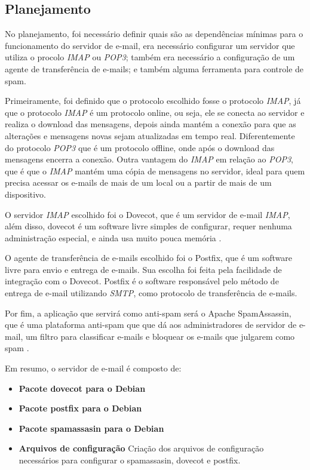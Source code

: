 \subsection{Planejamento}

No planejamento, foi necessário definir
quais são as dependências mínimas para o funcionamento do servidor de e-mail, era 
necessário configurar um servidor que utiliza o procolo \textit{IMAP} ou \textit{POP3};
também era necessário a configuração de um agente de transferência de e-mails; e também
alguma ferramenta para controle de spam.

Primeiramente, foi definido que o protocolo escolhido fosse o protocolo \textit{IMAP}, já
que o protocolo \textit{IMAP} é um protocolo online, ou seja, ele se conecta ao servidor
e realiza o download das mensagens, depois ainda  mantém a conexão para que
as alterações e mensagens novas sejam atualizadas em tempo real. Diferentemente do
protocolo \textit{POP3} que é um protocolo offline, onde após o download das mensagens encerra
a conexão. Outra vantagem do \textit{IMAP} em relação ao \textit{POP3}, que é que o 
\textit{IMAP} mantém uma cópia de mensagens no servidor, ideal para quem precisa 
acessar os e-mails de mais de um local ou a partir de mais de um dispositivo.

O servidor \textit{IMAP} escolhido foi o Dovecot, que é um servidor de e-mail
\textit{IMAP}, além disso, dovecot é um software livre simples de configurar, requer nenhuma
administração especial, e ainda usa muito pouca memória \cite{dovecot}. 

O agente de transferência de e-mails escolhido foi o Postfix, que é um software
livre para envio e entrega de e-mails. Sua escolha foi feita pela facilidade de
integração com o Dovecot. Postfix é o software responsável pelo método de entrega de e-mail
utilizando \textit{SMTP}, como protocolo de transferência de e-mails. 

Por fim, a aplicação que servirá como anti-spam será o Apache SpamAssassin, que 
é uma plataforma anti-spam que que dá aos administradores de servidor de e-mail, 
um filtro para classificar e-mails e bloquear os e-mails que julgarem como spam \cite{spam}. 

Em resumo, o servidor de e-mail é composto de:

\begin{itemize}
   \item \textbf{Pacote dovecot para o Debian}
   \item \textbf{Pacote postfix para o Debian}
   \item \textbf{Pacote spamassasin para o Debian}
   \item \textbf{Arquivos de configuração} Criação dos arquivos de configuração
   necessários para configurar o spamassasin, dovecot e postfix.
\end{itemize}

